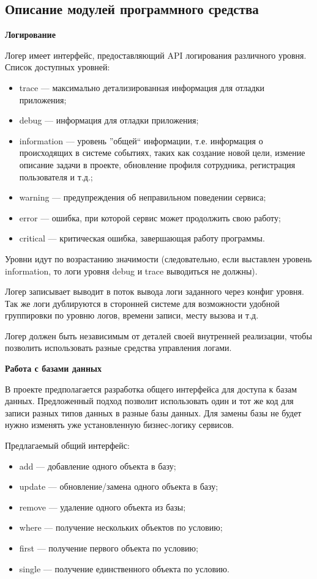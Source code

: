 \subsection{Описание модулей программного средства}\label{sec:domain:func}

\textbf{Логирование}

Логер имеет интерфейс, предоставляющий API логирования различного уровня. Список доступных уровней:

\begin{itemize}
    \item trace — максимально детализированная информация для отладки приложения;
    \item debug — информация для отладки приложения;
    \item information  — уровень ''общей`` информации, т.е. информация о происходящих в системе событиях, таких как создание новой цели, измение описание задачи в проекте, обновление профиля сотрудника, регистрация пользователя и т.д.;
    \item warning  — предупреждения об неправильном поведении сервиса;
    \item error — ошибка, при которой сервис может продолжить свою работу;
    \item critical  — критическая ошибка, завершающая работу программы.
\end{itemize}

Уровни идут по возрастанию значимости (следовательно, если выставлен уровень information, то логи уровня debug и trace выводиться не должны).

Логер записывает выводит в поток вывода логи заданного через конфиг уровня. Так же логи дублируются в сторонней системе для возможности удобной группировки по уровню логов, времени записи, месту вызова и т.д.

Логер должен быть независимым от деталей своей внутренней реализации, чтобы позволить использовать разные средства управления логами.

\bigskip
\textbf{Работа с базами данных}

В проекте предполагается разработка общего интерфейса для доступа к базам данных. Предложенный подход позволит использовать один и тот же код для записи разных типов данных в разные базы данных. Для замены базы не будет нужно изменять уже установленную бизнес-логику сервисов.

Предлагаемый общий интерфейс:
\begin{itemize}
	\item add — добавление одного объекта в базу;
	\item update — обновление/замена одного объекта в базу;
	\item remove — удаление одного объекта из базы;
	\item where — получение нескольких объектов по условию;
	\item first — получение первого объекта по условию;
	\item single — получение единственного объекта по условию.
\end{itemize}

